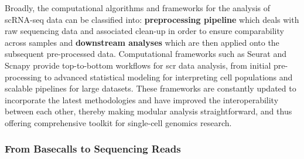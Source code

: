 \vspace{3mm}

\par Broadly, the computational algorithms and frameworks for the analysis of scRNA-seq data can be classified into: \textbf{preprocessing pipeline} which deals with raw sequencing data and associated clean-up in order to ensure comparability across samples and \textbf{downstream analyses} which are then applied onto the subsequent pre-processed data. Computational frameworks such as Seurat \textbf{\cite{butler_integrating_2018,stuart_comprehensive_2019,hao_integrated_2021}} and Scnapy \textbf{\cite{wolf_scanpy_2018}} provide top-to-bottom workflows for \gls{scr} data analysis, from initial pre-processing to advanced statistical modeling for interpreting cell populations and scalable pipelines for large datasets. These frameworks are constantly updated to incorporate the latest methodologies and have improved the interoperability between each other, thereby making modular analysis straightforward, and thus offering comprehensive toolkit for single-cell genomics research. 

\clearpage
\subsubsection{From Basecalls to Sequencing Reads}



